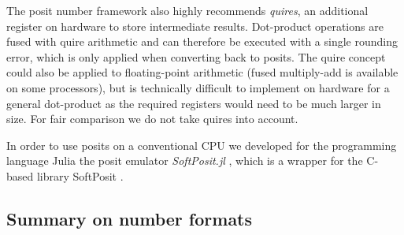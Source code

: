 The posit number framework also highly recommends \emph{quires}, an additional register on hardware to store intermediate results.
Dot-product operations are fused with quire arithmetic and can therefore be executed with a single rounding error, which is only applied
when converting back to posits. The quire concept could also be applied to floating-point arithmetic (fused multiply-add is available on
some processors), but is technically difficult to implement on hardware for a general dot-product as the required registers would need
to be much larger in size. For fair comparison we do not take quires into account. 

In order to use posits on a conventional CPU we developed for the programming language Julia \citep{Bezanson2017} the posit
emulator \emph{SoftPosit.jl} \citep{Klower2019}, which is a wrapper for the C-based library SoftPosit \citep{Leong2020}.

\subsection{Summary on number formats}
\label{sec:summary_formats}

